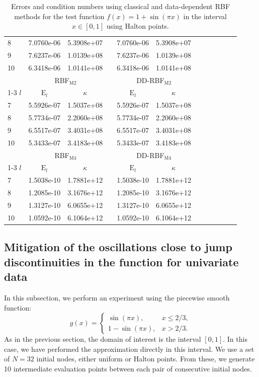 \documentclass[preprint]{elsarticle}       %
\begin{document}
\begin{table}[!ht]
\begin{center}
\begin{tabular}{lccccccccccc}
8 &7.0760e-06 & 5.3908e+07 && 7.0760e-06 & 5.3908e+07 && \\
9 &7.6237e-06 & 1.0139e+08 && 7.6237e-06 & 1.0139e+08 && \\
10 &6.3418e-06 & 1.0141e+08 && 6.3418e-06 & 1.0141e+08 && \\
\hline
\hline
& \multicolumn{2}{c}{RBF$_{\text{M2}}$} & &   \multicolumn{2}{c}{DD-RBF$_{\text{M2}}$}\\ \cline{1-3} \cline{5-7} $l$ & $\text{E}_l$ & $\kappa$ & &$\text{E}_l$ & $\kappa$ \\
7 &5.5926e-07 & 1.5037e+08 && 5.5926e-07 & 1.5037e+08 && \\
8 &5.7734e-07 & 2.2060e+08 && 5.7734e-07 & 2.2060e+08 && \\
9 &6.5517e-07 & 3.4031e+08 && 6.5517e-07 & 3.4031e+08 && \\
10 &5.3433e-07 & 3.4183e+08 && 5.3433e-07 & 3.4183e+08 && \\
\hline
\hline
& \multicolumn{2}{c}{RBF$_{\text{M4}}$} & &   \multicolumn{2}{c}{DD-RBF$_{\text{M4}}$}\\ \cline{1-3} \cline{5-7} $l$ & $\text{E}_l$ & $\kappa$ & &$\text{E}_l$ & $\kappa$ \\
7 &1.5038e-10 & 1.7881e+12 && 1.5038e-10 & 1.7881e+12 && \\
8 &1.2085e-10 & 3.1676e+12 && 1.2085e-10 & 3.1676e+12 && \\
9 &1.3127e-10 & 6.0655e+12 && 1.3127e-10 & 6.0655e+12 && \\
10 &1.0592e-10 & 6.1064e+12 && 1.0592e-10 & 6.1064e+12 && \\
\hline
\end{tabular}
\end{center}
\caption{Errors and condition numbers using classical and data-dependent RBF methods for the test function $f(x)=1+\sin(\pi x)$ in the interval $x\in[0,1]$ using Halton points.}\label{texp2}
\end{table}




\subsection{Mitigation of the oscillations close to jump discontinuities in the function for univariate data}
In this subsection, we perform an experiment using the piecewise smooth function:
\begin{equation}\label{funciong}
g(x)=\begin{cases}
\sin(\pi x), & x\leq  2/3, \\
1-\sin(\pi x), & x> 2/3.
\end{cases}
\end{equation}
As in the previous section, the domain of interest is the interval $[0, 1]$. In this case, we have performed the approximation directly in this interval. We use a set of $N = 32$ initial nodes, either uniform or Halton points. From these, we generate 10 intermediate evaluation points between each pair of consecutive initial nodes. 
\end{document}
